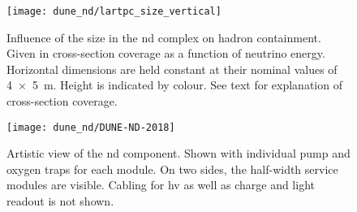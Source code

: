 \begin{figure}[htb]
	\centering
	\texttt{[image: dune\_nd/lartpc\_size\_vertical]}
	\caption{Influence of the \lartpc{} size in the \dune{} \gls{nd} complex on hadron containment.
		Given in cross-section coverage as a function of neutrino energy.
		Horizontal dimensions are held constant at their nominal values of \SI{4 x 5}{\metre}.
		Height is indicated by colour.
		See text for explanation of cross-section coverage.}
	\label{fig:dune-nd_lartpc-size}
\end{figure}

\begin{figure}[htb]
	\centering
	\texttt{[image: dune\_nd/DUNE-ND-2018]}
	\caption{Artistic view of the \dune{} \gls{nd} \AC{} component.
		Shown with individual pump and oxygen traps for each module.
		On two sides, the half-width service modules are visible.
		Cabling for \gls{hv} as well as charge and light readout is not shown.}
	\label{fig:dune-nd_ac}
\end{figure}

